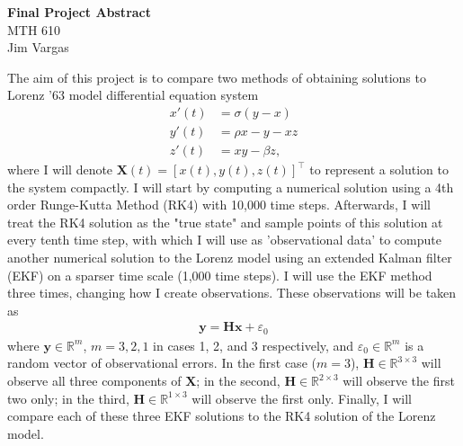 \documentclass[12]{article}
\begin{document}
\begin{center}
\textbf{Final Project Abstract}\\
MTH 610\\
Jim Vargas\\
\end{center}

The aim of this project is to compare two methods of obtaining solutions to Lorenz '63 model differential equation system
\begin{align*}
x'(t) &= \sigma (y-x) \\
y'(t) &= \rho x - y -xz \\
z'(t) &= xy - \beta z,
\end{align*}
where I will denote $\mathbf{X}(t) =[x(t),y(t),z(t)]^\top$ to represent a solution to the system compactly. I will start by computing a numerical solution using a 4th order Runge-Kutta Method (RK4) with 10,000 time steps. Afterwards, I will treat the RK4 solution as the "true state" and sample points of this solution at every tenth time step, with which I will use as 'observational data' to compute another numerical solution to the Lorenz model using an extended Kalman filter (EKF) on a sparser time scale (1,000 time steps). I will use the EKF method three times, changing how I create observations. These observations will be taken as
\begin{align*}
\mathbf{y}=\mathbf{Hx}+\varepsilon_0
\end{align*}
where $\mathbf{y}\in \mathds{R}^m$, $m=3,2,1$ in cases 1, 2, and 3 respectively, and $\varepsilon_0 \in \mathds{R}^m$ is a random vector of observational errors. In the first case ($m=3$), $\mathbf{H} \in \mathds{R}^{3\times 3}$ will observe all three components of $\mathbf{X}$; in the second, $\mathbf{H}\in \mathds{R}^{2\times3}$ will observe the first two only; in the third, $\mathbf{H}\in \mathds{R}^{1\times 3}$ will observe the first only. Finally, I will compare each of these three EKF solutions to the RK4 solution of the Lorenz model.
\end{document}
